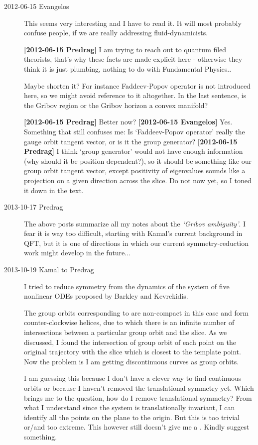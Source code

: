 \begin{description}
\item[2012-06-15 Evangelos]
This seems very interesting and I have to read it. It will most probably
confuse people, if we are really addressing fluid-dynamicists.

{\bf [2012-06-15 Predrag]} I am trying to reach out to quantum filed
theorists, that's why these facts are made explicit here - otherwise they
think it is just plumbing, nothing to do with Fundamental Physics..

Maybe shorten it? For instance Faddeev-Popov operator is not introduced
here, so we might avoid reference to it altogether. In the last sentence,
is the Gribov region or the Gribov horizon a convex manifold?

{\bf [2012-06-15 Predrag]} Better now? {\bf [2012-06-15 Evangelos]}  Yes.
Something that still confuses me: Is `Faddeev-Popov operator' really the
gauge orbit tangent vector, or is it the group generator? {\bf
[2012-06-15 Predrag]} I think `group generator' would not have enough
information (why should it be position dependent?), so it should be
something like our group orbit tangent vector, except positivity of
eigenvalues sounds like a projection on a given direction across the
slice. Do not now yet, so I toned it down in the text.

\item[2013-10-17 Predrag] The above posts summarize all my
notes about the \emph{`Gribov ambiguity'}. I fear it is way too difficult,
starting with Kamal's current background in QFT, but it is one of
directions in which our current symmetry-reduction work might
develop in the future...

\item[2013-10-19 Kamal to Predrag] I tried to reduce  symmetry
from the dynamics of the system of five nonlinear ODEs proposed by
Barkley and Kevrekidis.


The group orbits corresponding to  are non-compact in this
case and form counter-clockwise helices, due to which there is an
infinite number of intersections between a particular group orbit and
the slice. As we discussed, I found the intersection of group orbit
of each point on the original trajectory with the slice which is
closest to the template point. Now the problem is I am getting
discontinuous curves as group orbits.



I am guessing this because I don't have a clever way to find
continuous orbits or because I haven't removed the translational
symmetry yet. Which brings me to the question, how do I remove
translational symmetry? From what I understand since the system is
translationally invariant, I can identify all the points on the plane
to the origin. But this is too trivial or/and too extreme. This
however still doesn't give me a \rpo.
Kindly suggest something.


\end{description}
